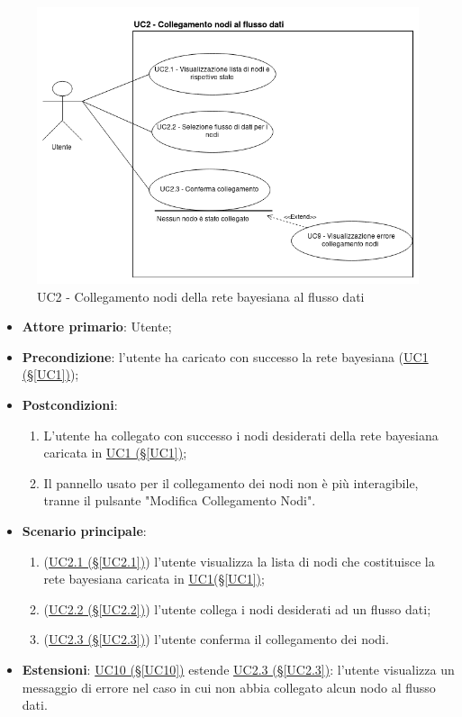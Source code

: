 \begin{figure}[H]
\centering
\includegraphics[scale=0.5]{./images/UC2.png}
\caption{UC2 - Collegamento nodi della rete bayesiana al flusso dati}
\end{figure}

\begin{itemize}
\item \textbf{Attore primario}: Utente;
\item \textbf{Precondizione}: l'utente ha caricato con successo la rete bayesiana (\hyperref[UC1]{UC1 (§\ref*{UC1})});
\item \textbf{Postcondizioni}: 
	\begin{enumerate}
	\item L'utente ha collegato con successo i nodi desiderati della rete bayesiana caricata in \hyperref[UC1]{UC1 				(§\ref*{UC1})};
	\item Il pannello usato per il collegamento dei nodi non è più interagibile, tranne il pulsante "Modifica 							Collegamento Nodi".
	\end{enumerate}
\item \textbf{Scenario principale}:
	\begin{enumerate}
	\item (\hyperref[UC2.1]{UC2.1 (§\ref*{UC2.1})}) l'utente visualizza la lista di nodi che costituisce la rete bayesiana caricata in \hyperref[UC1]{UC1(§\ref*{UC1})};
	\item (\hyperref[UC2.2]{UC2.2 (§\ref*{UC2.2})}) l'utente collega i nodi desiderati ad un flusso dati;
	\item (\hyperref[UC2.3]{UC2.3 (§\ref*{UC2.3})}) l'utente conferma il collegamento dei nodi.
	\end{enumerate}
\item \textbf{Estensioni}: \hyperref[UC10]{UC10 (§\ref*{UC10})} estende \hyperref[UC2.3]{UC2.3 (§\ref*{UC2.3})}: l'utente visualizza un messaggio di errore nel caso in cui non abbia collegato alcun nodo al flusso dati.
\end{itemize}

